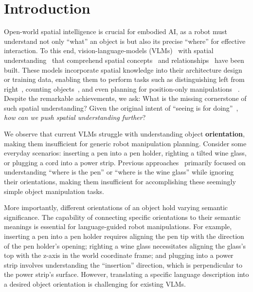 \section{Introduction}\label{sec:intro}

Open-world spatial intelligence is crucial for embodied AI, as a robot must understand not only ``what'' an object is but also its precise ``where'' for effective interaction.
To this end, vision-language-models (VLMs)~\cite{Flamingo22,BLIP22,LLaVA23,DreamLLM23} with spatial understanding~\cite{SpatialVLM24,SpatialBot24,SpatialRGPT24} that comprehend spatial concepts~\cite{PhysicalSceneUnderstanding24,ClassifyingEventsSceneGraph07} and relationships~\cite{GlanceRealWorldScene07,VisualGenome17,3DSemanticSceneGraph20} have been built. These models incorporate spatial knowledge into their architecture design or training data, enabling them to perform tasks such as distinguishing left from right~\cite{SpatialVLM24,SpatialRGPT24}, counting objects~\cite{SpatialBot24,embspatial24}, and even planning for position-only manipulations
~\cite{RoboPoint24,SpatialBot24}.
Despite the remarkable achievements, we ask: What is the missing cornerstone of such spatial understanding? 
Given the original intent of ``seeing is for doing''~\cite{WorldISee23}, \textit{how can we push spatial understanding further}?


We observe that current VLMs struggle with understanding object \textbf{orientation}, making them insufficient for generic robot manipulation planning.
Consider some everyday scenarios: inserting a pen into a pen holder, righting a tilted wine glass, or plugging a cord into a power strip. 
Previous approaches~\cite{SpatialVLM24,SpatialRGPT24,SpatialBot24} primarily focused on understanding ``where is the pen'' or ``where is the wine glass'' while ignoring their orientations, making them insufficient for accomplishing these seemingly simple object manipulation tasks.

More importantly, different orientations of an object hold varying semantic significance. The capability of connecting specific orientations to their semantic meanings is essential for language-guided robot manipulations. For example, inserting a pen into a pen holder requires aligning the pen tip with the direction of the pen holder's opening; righting a wine glass necessitates aligning the glass's top with the z-axis in the world coordinate frame; and plugging into a power strip involves understanding the ``insertion'' direction, which is perpendicular to the power strip's surface.
However, translating a specific language description into a desired object orientation is challenging for existing VLMs.

